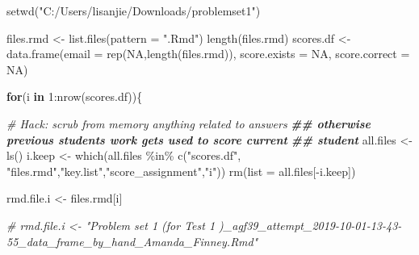 \documentclass[
]{book}
\newenvironment{Shaded}{\begin{snugshade}}{\end{snugshade}}
\newcommand{\AttributeTok}[1]{\textcolor[rgb]{0.77,0.63,0.00}{#1}}
\newcommand{\CommentTok}[1]{\textcolor[rgb]{0.56,0.35,0.01}{\textit{#1}}}
\newcommand{\ConstantTok}[1]{\textcolor[rgb]{0.00,0.00,0.00}{#1}}
\newcommand{\ControlFlowTok}[1]{\textcolor[rgb]{0.13,0.29,0.53}{\textbf{#1}}}
\newcommand{\DecValTok}[1]{\textcolor[rgb]{0.00,0.00,0.81}{#1}}
\newcommand{\DocumentationTok}[1]{\textcolor[rgb]{0.56,0.35,0.01}{\textbf{\textit{#1}}}}
\newcommand{\FunctionTok}[1]{\textcolor[rgb]{0.00,0.00,0.00}{#1}}
\newcommand{\NormalTok}[1]{#1}
\newcommand{\OtherTok}[1]{\textcolor[rgb]{0.56,0.35,0.01}{#1}}
\newcommand{\SpecialCharTok}[1]{\textcolor[rgb]{0.00,0.00,0.00}{#1}}
\newcommand{\StringTok}[1]{\textcolor[rgb]{0.31,0.60,0.02}{#1}}
\begin{document}
\begin{Shaded}
\end{Shaded}

\begin{Shaded}
\begin{Highlighting}[]
\FunctionTok{setwd}\NormalTok{(}\StringTok{"C:/Users/lisanjie/Downloads/problemset1"}\NormalTok{)}

\NormalTok{files.rmd }\OtherTok{\textless{}{-}} \FunctionTok{list.files}\NormalTok{(}\AttributeTok{pattern  =} \StringTok{".Rmd"}\NormalTok{)}
\FunctionTok{length}\NormalTok{(files.rmd)}
\NormalTok{scores.df }\OtherTok{\textless{}{-}} \FunctionTok{data.frame}\NormalTok{(}\AttributeTok{email =} \FunctionTok{rep}\NormalTok{(}\ConstantTok{NA}\NormalTok{,}\FunctionTok{length}\NormalTok{(files.rmd)),}
                        \AttributeTok{score.exists =} \ConstantTok{NA}\NormalTok{,}
                        \AttributeTok{score.correct =} \ConstantTok{NA}\NormalTok{)}

\ControlFlowTok{for}\NormalTok{(i }\ControlFlowTok{in} \DecValTok{1}\SpecialCharTok{:}\FunctionTok{nrow}\NormalTok{(scores.df))\{}

  
\CommentTok{\# Hack: scrub from memory anything related to answers}
\DocumentationTok{\#\# otherwise previous students work gets used to score current}
\DocumentationTok{\#\# student}
\NormalTok{all.files }\OtherTok{\textless{}{-}} \FunctionTok{ls}\NormalTok{()   }
\NormalTok{i.keep }\OtherTok{\textless{}{-}} \FunctionTok{which}\NormalTok{(all.files }\SpecialCharTok{\%in\%} \FunctionTok{c}\NormalTok{(}\StringTok{"scores.df"}\NormalTok{, }\StringTok{"files.rmd"}\NormalTok{,}\StringTok{"key.list"}\NormalTok{,}\StringTok{"score\_assignment"}\NormalTok{,}\StringTok{"i"}\NormalTok{))}
\FunctionTok{rm}\NormalTok{(}\AttributeTok{list =}\NormalTok{ all.files[}\SpecialCharTok{{-}}\NormalTok{i.keep])  }
  
  
\NormalTok{rmd.file.i }\OtherTok{\textless{}{-}}\NormalTok{ files.rmd[i]}

\CommentTok{\# rmd.file.i \textless{}{-} "Problem set 1 (for  Test 1 )\_agf39\_attempt\_2019{-}10{-}01{-}13{-}43{-}55\_data\_frame\_by\_hand\_Amanda\_Finney.Rmd"}


\end{Highlighting}
\end{Shaded}
\end{document}
